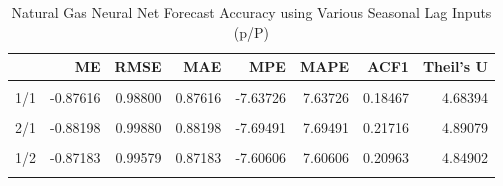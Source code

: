 \documentclass[
]{article}
\begin{document}
\begin{table}[H]

\caption{\label{tab:unnamed-chunk-6}Natural Gas Neural Net Forecast Accuracy using Various Seasonal Lag Inputs (p/P)}
\centering
\begin{tabular}[t]{l|r|r|r|r|r|r|r}
\hline
  & ME & RMSE & MAE & MPE & MAPE & ACF1 & Theil's U\\
\hline
\cellcolor{gray!6}{1/0} & \cellcolor{gray!6}{-1.17533} & \cellcolor{gray!6}{1.29899} & \cellcolor{gray!6}{1.17533} & \cellcolor{gray!6}{-10.54275} & \cellcolor{gray!6}{10.54275} & \cellcolor{gray!6}{0.28462} & \cellcolor{gray!6}{46.21817}\\
\hline
1/1 & -0.87616 & 0.98800 & 0.87616 & -7.63726 & 7.63726 & 0.18467 & 4.68394\\
\hline
\cellcolor{gray!6}{2/0} & \cellcolor{gray!6}{-1.01868} & \cellcolor{gray!6}{1.14866} & \cellcolor{gray!6}{1.01868} & \cellcolor{gray!6}{-9.00372} & \cellcolor{gray!6}{9.00372} & \cellcolor{gray!6}{0.29337} & \cellcolor{gray!6}{17.28475}\\
\hline
2/1 & -0.88198 & 0.99880 & 0.88198 & -7.69491 & 7.69491 & 0.21716 & 4.89079\\
\hline
\cellcolor{gray!6}{2/2} & \cellcolor{gray!6}{-0.87055} & \cellcolor{gray!6}{0.99976} & \cellcolor{gray!6}{0.87055} & \cellcolor{gray!6}{-7.60248} & \cellcolor{gray!6}{7.60248} & \cellcolor{gray!6}{0.22890} & \cellcolor{gray!6}{4.45841}\\
\hline
1/2 & -0.87183 & 0.99579 & 0.87183 & -7.60606 & 7.60606 & 0.20963 & 4.84902\\
\hline
\cellcolor{gray!6}{3/1} & \cellcolor{gray!6}{-0.89269} & \cellcolor{gray!6}{1.00988} & \cellcolor{gray!6}{0.89269} & \cellcolor{gray!6}{-7.79637} & \cellcolor{gray!6}{7.79637} & \cellcolor{gray!6}{0.22178} & \cellcolor{gray!6}{4.99201}\\
\hline
\end{tabular}
\end{table}
\end{document}
